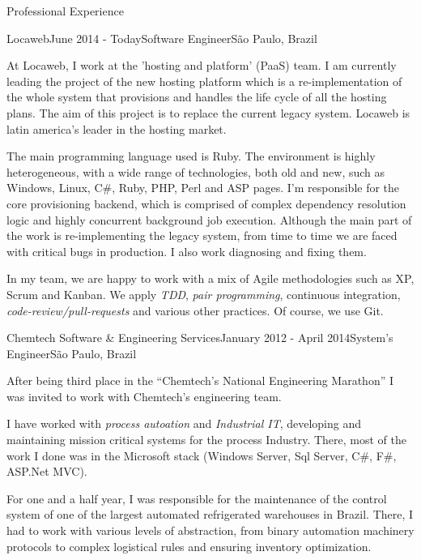 \documentclass{resume} %
\begin{document}
\begin{rSection}{Professional Experience}
  \begin{rSubsection}{Locaweb}{June 2014 - Today}{Software Engineer}{São
      Paulo, Brazil}

  \item At Locaweb, I work at the 'hosting and platform' (PaaS) team. I am
    currently leading the project of the new hosting platform which is a
    re-implementation of the whole system that provisions and handles the
    life cycle of all the hosting plans. The aim of this project is to replace
    the current legacy system. Locaweb is latin america's leader in the hosting
    market.

  \item The main programming language used is Ruby. The environment is highly
    heterogeneous, with a wide range of technologies, both old and new, such as
    Windows, Linux, C\#, Ruby, PHP, Perl and ASP pages. I'm responsible for the
    core provisioning backend, which is comprised of complex dependency
    resolution logic and highly concurrent background job execution. Although
    the main part of the work is re-implementing the legacy system, from time to
    time we are faced with critical bugs in production. I also work diagnosing
    and fixing them.

  \item In my team, we are happy to work with a mix of Agile methodologies such
    as XP, Scrum and Kanban. We apply {\em TDD}, {\em pair programming},
    continuous integration, {\em code-review/pull-requests} and various other
    practices. Of course, we use Git.
  \end{rSubsection}

  \begin{rSubsection}{Chemtech Software \& Engineering Services}{January 2012 -
      April 2014}{System's Engineer}{São Paulo, Brazil}

  \item After being third place in the ``Chemtech's National Engineering
    Marathon'' I was invited to work with Chemtech's engineering team.

  \item I have worked with {\em process autoation} and {\em Industrial IT},
    developing and maintaining mission critical systems for the process
    Industry. There, most of the work I done was in the Microsoft stack (Windows
    Server, Sql Server, C\#, F\#, ASP.Net MVC).

  \item For one and a half year, I was responsible for the maintenance of the
    control system of one of the largest automated refrigerated warehouses in
    Brazil. There, I had to work with various levels of abstraction, from binary
    automation machinery protocols to complex logistical rules and ensuring
    inventory optimization.


\end{rSubsection}
\end{rSection}
\end{document}
